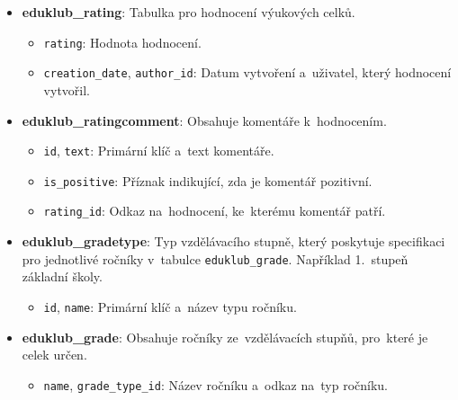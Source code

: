 \documentclass[male,czech,api_bc]{kitheses}
\begin{document}
\begin{itemize}
	\item \textbf{eduklub\_rating}: Tabulka pro hodnocení výukových celků.
	\begin{itemize}
		\item \texttt{rating}: Hodnota hodnocení.
		\item \texttt{creation\_date}, \texttt{author\_id}: Datum vytvoření a~uživatel, který hodnocení vytvořil.
	\end{itemize}
	
	\item \textbf{eduklub\_ratingcomment}: Obsahuje komentáře k~hodnocením.
	\begin{itemize}
		\item \texttt{id}, \texttt{text}: Primární klíč a~text komentáře.
		\item \texttt{is\_positive}: Příznak indikující, zda je komentář pozitivní.
		\item \texttt{rating\_id}: Odkaz na~hodnocení, ke~kterému komentář patří.
	\end{itemize}
	
	\item \textbf{eduklub\_gradetype}: Typ vzdělávacího stupně, který poskytuje specifikaci pro jednotlivé ročníky v~tabulce \texttt{eduklub\_grade}. Například 1.~stupeň základní školy.
	\begin{itemize}
		\item \texttt{id}, \texttt{name}: Primární klíč a~název typu ročníku.
	\end{itemize}
	
	\item \textbf{eduklub\_grade}: Obsahuje ročníky ze~vzdělávacích stupňů, pro~které je celek určen.
	\begin{itemize}
		\item \texttt{name}, \texttt{grade\_type\_id}: Název ročníku a~odkaz na~typ ročníku.
	\end{itemize}
\end{itemize}

\bigskip
\end{document}
